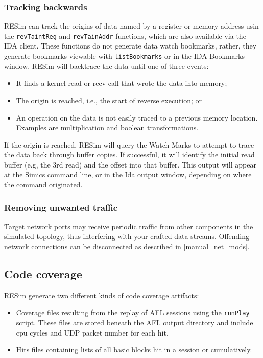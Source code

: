 \documentclass[titlepage]{article}
\begin{document}
\subsubsection{Tracking backwards}
RESim can track the origins of data named by a register or memory address usin the {\tt revTaintReg} and {\tt revTainAddr} functions, which are also
available via the IDA client.  These functions do not generate data watch bookmarks, rather, they generate bookmarks viewable with {\tt listBookmarks} or
in the IDA Bookmarks window.  RESim will backtrace the data until one of three events:
\begin{itemize}
\item It finds a kernel read or recv call that wrote the data into memory;
\item The origin is reached, i.e., the start of reverse execution; or
\item An operation on the data is not easily traced to a previous memory location.  Examples are multiplication and boolean transformations.
\end{itemize}
If the origin is reached, RESim will query the Watch Marks to attempt to trace the data back through buffer copies.  If successful, it will identify
the initial read buffer (e.g, the 3rd read) and the offset into that buffer.  This output will appear at the Simics command line, or in the Ida output
window, depending on where the command originated.

\subsubsection{Removing unwanted traffic}
Target network ports may receive periodic traffic from other components in the simulated topology, thus interfering with your crafted data streams.
Offending network connections can be disconnected as described in \ref{manual_net_mods}.


\subsection{Code coverage}
\label{coverage}
RESim generate two different kinds of code coverage artifacts:
\begin{itemize}
\item Coverage files resulting from the replay of AFL sessions using the {\tt runPlay} script.  These files are stored beneath the AFL output directory
and include cpu cycles and UDP packet number for each hit. 
\item Hits files containing lists of all basic blocks hit in a session or cumulatively.
\end{itemize}
\end{document}
